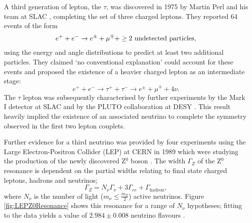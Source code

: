 A third generation of lepton, the $\tau$, was discovered in 1975 by Martin Perl and his team at SLAC \cite{Perl1975}, completing the set of three charged leptons.  They reported 64 events of the form
\begin{equation}
  e^+ + e^- \rightarrow e^{\pm} + \mu^{\mp} + \ge 2 \textnormal{ undetected particles},
\end{equation}
using the energy and angle distributions to predict at least two additional particles.  They claimed `no conventional explanation' could account for these events and proposed the existence of a heavier charged lepton as an intermediate stage:
\begin{equation}
  e^+ + e^- \rightarrow \tau^+ + \tau^- \rightarrow e^{\pm} + \mu^{\mp} + 4\nu.
\end{equation}
The $\tau$ lepton was subsequently characterised by further experiments by the Mark I detector at SLAC \cite{Feldman1977} and by the PLUTO collaboration at DESY \cite{Burmester1977}.  This result heavily implied the existence of an associated neutrino to complete the symmetry observed in the first two lepton couplets.

Further evidence for a third neutrino was provided by four experiments using the Large Electron-Positron Collider (LEP) at CERN in 1989 which were studying the production of the newly discovered Z$^0$ boson \cite{DeCamp1989,Adeva1989,Akrawy1989,Aarnio1989}.  The width $\Gamma_Z$ of the Z$^0$ resonance is dependent on the partial widths relating to final state charged leptons, hadrons and neutrinos;
\begin{equation}
  \Gamma_Z = N_{\nu} \Gamma_{\nu} + 3 \Gamma_{ee} + \Gamma_{\mathrm{hadron}},
\end{equation}
where $N_{\nu}$ is the number of light ($m_{\nu} \le \frac{m_Z}{2}$) active neutrinos.  Figure \ref{fig:LEPZ0Resonance} shows this resonance for a range of $N_{\nu}$ hypotheses; fitting to the data yields a value of $2.984 \pm 0.008$ neutrino flavours \cite{Schael2006}.

